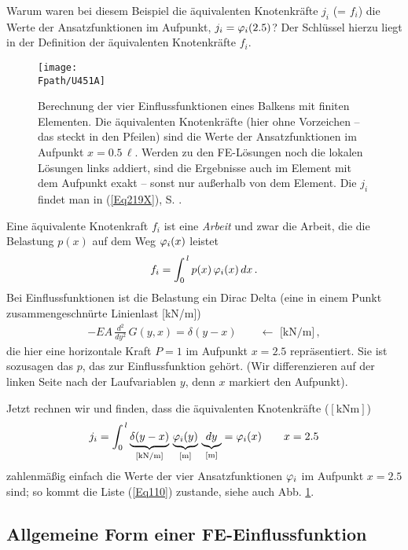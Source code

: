 Warum waren bei diesem Beispiel die \"{a}quivalenten Knotenkr\"{a}fte $j_i$ (= $f_i$) die Werte der Ansatzfunktionen im Aufpunkt, $j_i = \varphi_i(2.5)$? Der Schl\"{u}ssel hierzu liegt in der Definition der \"{a}quivalenten Knotenkr\"{a}fte $f_i$.

\begin{figure}[tbp]
\centering
\if {} \sidecaption[t] \fi
\texttt{[image: \\Fpath/U451A]}
\caption{Berechnung der vier Einflussfunktionen eines Balkens mit finiten Elementen. Die \"{a}quivalenten Knotenkr\"{a}fte (hier ohne Vorzeichen -- das steckt in den Pfeilen) sind die Werte der Ansatzfunktionen im Aufpunkt $x = 0.5\,\ell$. Werden zu den FE-L\"{o}sungen noch die lokalen L\"{o}sungen links addiert, sind die Ergebnisse auch im Element mit dem Aufpunkt exakt -- sonst nur au{\ss}erhalb von dem Element. Die $j_i$ findet man in (\ref{Eq219X}), S. \pageref{Eq219X}. } \label{U451}
\end{figure}%
Eine \"{a}quivalente Knotenkraft $f_i$ ist eine {\em Arbeit\/} und zwar die Arbeit, die die Belastung $p(x)$  auf dem Weg  $\varphi_i(x)$ leistet
\begin{align}
f_i = \int_0^{\,l} p(x)\,\varphi_i(x)\,dx\,.
\end{align}
Bei Einflussfunktionen ist die Belastung ein Dirac Delta (eine in einem Punkt zusammengeschn\"{u}rte Linienlast [kN/m])
\begin{align}
-EA\,\frac{d^2}{dy^2}\,G(y,x) = \delta(y-x) \qquad \leftarrow \,\,\text{[kN/m]}\,,
\end{align}
die hier eine horizontale Kraft $P = 1$ im Aufpunkt $x = 2.5$ repr\"{a}sentiert. Sie ist sozusagen das $p$, das zur Einflussfunktion geh\"{o}rt. (Wir differenzieren auf der linken Seite nach der Laufvariablen $y$, denn $x$ markiert den  Aufpunkt).

Jetzt rechnen wir und finden, dass die \"{a}quivalenten Knotenkr\"{a}fte ($[\text{kNm}]$)
\begin{align}
j_i = \int_0^{\,l} \underbrace{\delta(y-x)}_{[\text{kN/m}]}\,\underbrace{\varphi_i(y)}_{[\text{m}]}\,\underbrace{dy}_{\text{[m]}} = \varphi_i(x)  \qquad x = 2.5
\end{align}
zahlenm\"{a}{\ss}ig einfach die Werte der vier Ansatzfunktionen $\varphi_i$ im Aufpunkt $x = 2.5$ sind; so kommt die Liste (\ref{Eq110}) zustande, siehe auch Abb. \ref{U451}.

{\textcolor{sectionTitleBlue}{\section{Allgemeine Form einer FE-Einflussfunktion}}}

